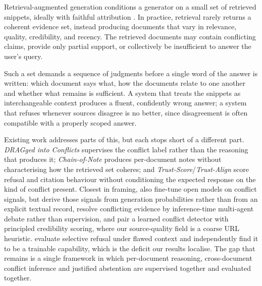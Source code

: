 \documentclass[11pt]{article}
\begin{document}
Retrieval-augmented generation conditions a generator on a small set of retrieved
snippets, ideally with faithful attribution
\citep{lewis2020rag,borgeaud2022,gao2024retrievalaugmentedgenerationlargelanguage,guu2020realm}.
In practice, retrieval rarely returns a coherent evidence set, instead
producing documents that vary in relevance, quality, credibility, and recency.
The retrieved documents may contain conflicting claims, provide only partial
support, or collectively be insufficient to answer the user's query.

Such a set demands a sequence of judgments before a single word of the answer is
written: which document says what, how the documents relate to one another and
whether what remains is sufficient. A system that treats the snippets as
interchangeable context produces a fluent, confidently wrong answer; a system
that refuses whenever sources disagree is no better, since disagreement is often
compatible with a properly scoped answer.

Existing work addresses parts of this, but each stops short of a different part.
\textit{DRAGged into Conflicts} \citep{cattan2025dragged} supervises the conflict
label rather than the reasoning that produces it; \textit{Chain-of-Note}
\citep{yu2024chainofnote} produces per-document notes without characterising how the
retrieved set coheres; and \textit{Trust-Score}/\textit{Trust-Align}
\citep{song2025trustalign} score refusal and citation behaviour without conditioning
the expected response on the kind of conflict present. Closest in framing, \citet{wu2026conflictaware} also fine-tune open models on
conflict signals, but derive those signals from generation probabilities rather
than from an explicit textual record, \citet{wang2025conflictingevidence}
resolve conflicting evidence by inference-time multi-agent debate rather than
supervision, and \citet{wang2026conflictrag} pair a learned conflict detector
with principled credibility scoring, where our source-quality field is a coarse
URL heuristic. \citet{muhamed2025refusalbench} evaluate selective refusal
under flawed context and independently find it to be a trainable capability,
which is the deficit our results localise. The gap that remains is a single
framework in which per-document reasoning, cross-document conflict inference and
justified abstention are supervised together and evaluated together.
\end{document}
